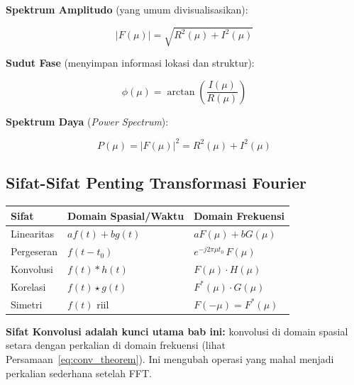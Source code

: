 \documentclass[12pt,a4paper]{article}
\begin{document}
\textbf{Spektrum Amplitudo} (yang umum divisualisasikan):

\begin{equation}
  |F(\mu)| = \sqrt{R^2(\mu) + I^2(\mu)}
  \label{eq:spectrum_1d}
\end{equation}

\textbf{Sudut Fase} (menyimpan informasi lokasi dan struktur):

\begin{equation}
  \phi(\mu) = \arctan\!\left(\frac{I(\mu)}{R(\mu)}\right)
  \label{eq:phase_1d}
\end{equation}

\textbf{Spektrum Daya} (\textit{Power Spectrum}):

\begin{equation}
  P(\mu) = |F(\mu)|^2 = R^2(\mu) + I^2(\mu)
  \label{eq:power_1d}
\end{equation}

\subsection{Sifat-Sifat Penting Transformasi Fourier}

\begin{center}
\renewcommand{\arraystretch}{1.4}
\begin{tabular}{lll}
\toprule
\textbf{Sifat} & \textbf{Domain Spasial/Waktu} & \textbf{Domain Frekuensi} \\
\midrule
Linearitas     & $af(t) + bg(t)$               & $aF(\mu) + bG(\mu)$ \\
Pergeseran     & $f(t - t_0)$                  & $e^{-j2\pi\mu t_0}\,F(\mu)$ \\
Konvolusi      & $f(t) * h(t)$                 & $F(\mu) \cdot H(\mu)$ \\
Korelasi       & $f(t) \star g(t)$             & $F^*(\mu) \cdot G(\mu)$ \\
Simetri        & $f(t)$ riil                   & $F(-\mu) = F^*(\mu)$ \\
\bottomrule
\end{tabular}
\end{center}

\begin{tipbox}
\textbf{Sifat Konvolusi adalah kunci utama bab ini:} konvolusi di domain spasial
setara dengan perkalian di domain frekuensi (lihat Persamaan~\eqref{eq:conv_theorem}).
Ini mengubah operasi yang mahal menjadi perkalian sederhana setelah FFT.
\end{tipbox}
\end{document}
